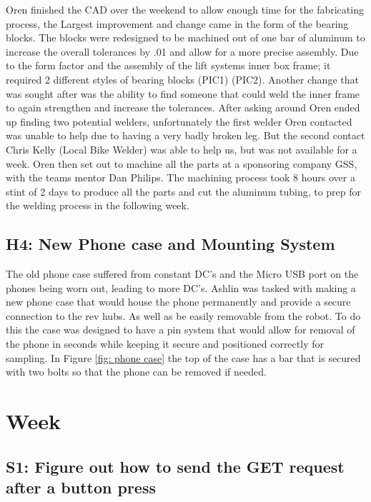 \documentclass{article}
\begin{document}
Oren finished the CAD over the weekend to allow enough time for the fabricating process, the Largest improvement and change came in the form of the bearing blocks. The blocks were redesigned to be machined out of one bar of aluminum to increase the overall tolerances by .01 and allow for a more precise assembly. Due to the form factor and the assembly of the lift systems inner box frame; it required 2 different styles of bearing blocks (PIC1) (PIC2). Another change that was sought after was the ability to find someone that could weld the inner frame to again strengthen and increase the tolerances. After asking around Oren ended up finding two potential welders, unfortunately the first welder Oren contacted was unable to help due to having a very badly broken leg. But the second contact Chris Kelly (Local Bike Welder) was able to help us, but was not available for a week. Oren then set out to machine all the parts at a sponsoring company GSS, with the teams mentor Dan Philips. The machining process took 8 hours over a stint of 2 days to produce all the parts and cut the aluminum tubing, to prep for the welding process in the following week. 

\subsection{H4: New Phone case and  Mounting System}

The old phone case suffered from constant DC's and the Micro USB port on the phones being worn out, leading to more DC's. Ashlin was tasked with making a new phone case that would house the phone permanently and provide a secure connection to the rev hubs. As well as be easily removable from the robot. To do this the case was designed to have a pin system that would allow for removal of the phone in seconds while keeping it secure and positioned correctly for sampling. In Figure \ref{fig: phone case} the top of the case has a bar that is secured with two bolts so that the phone can be removed if needed.
\clearpage \newpage \section{Week \thesection} 
\subsection{S1: Figure out how to send the GET request after a button press}
\end{document}
